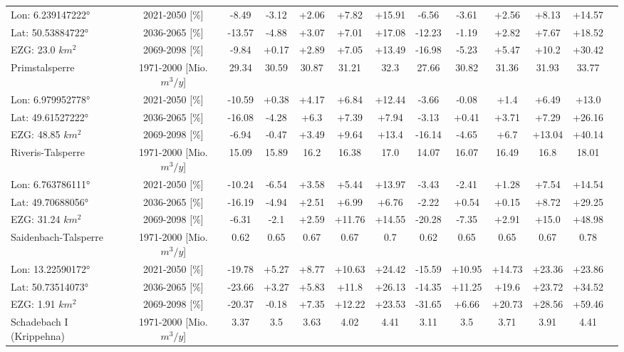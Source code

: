 \begin{longtable}{@{\extracolsep{\fill}}lc|ccccc||cccccc}
\cline{2-12} 
Lon: 6.239147222° & 2021-2050 [\%]  & -8.49 & -3.12 & +2.06 & +7.82 & +15.91 & -6.56 & -3.61 & +2.56 & +8.13 & +14.57\\ 
Lat: 50.53884722° & 2036-2065 [\%]  & -13.57 & -4.88 & +3.07 & +7.01 & +17.08 & -12.23 & -1.19 & +2.82 & +7.67 & +18.52\\ 
EZG: 23.0 $km^2$ & 2069-2098 [\%]  & -9.84 & +0.17 & +2.89 & +7.05 & +13.49 & -16.98 & -5.23 & +5.47 & +10.2 & +30.42\\ 
\hline 
Primstalsperre & 1971-2000 [Mio. $m^3/y$]  & 29.34 & 30.59 & 30.87 & 31.21 & 32.3 & 27.66 & 30.82 & 31.36 & 31.93 & 33.77\\ 
\cline{2-12} 
Lon: 6.979952778° & 2021-2050 [\%]  & -10.59 & +0.38 & +4.17 & +6.84 & +12.44 & -3.66 & -0.08 & +1.4 & +6.49 & +13.0\\ 
Lat: 49.61527222° & 2036-2065 [\%]  & -16.08 & -4.28 & +6.3 & +7.39 & +7.94 & -3.13 & +0.41 & +3.71 & +7.29 & +26.16\\ 
EZG: 48.85 $km^2$ & 2069-2098 [\%]  & -6.94 & -0.47 & +3.49 & +9.64 & +13.4 & -16.14 & -4.65 & +6.7 & +13.04 & +40.14\\ 
\hline 
Riveris-Talsperre & 1971-2000 [Mio. $m^3/y$]  & 15.09 & 15.89 & 16.2 & 16.38 & 17.0 & 14.07 & 16.07 & 16.49 & 16.8 & 18.01\\ 
\cline{2-12} 
Lon: 6.763786111° & 2021-2050 [\%]  & -10.24 & -6.54 & +3.58 & +5.44 & +13.97 & -3.43 & -2.41 & +1.28 & +7.54 & +14.54\\ 
Lat: 49.70688056° & 2036-2065 [\%]  & -16.19 & -4.94 & +2.51 & +6.99 & +6.76 & -2.22 & +0.54 & +0.15 & +8.72 & +29.25\\ 
EZG: 31.24 $km^2$ & 2069-2098 [\%]  & -6.31 & -2.1 & +2.59 & +11.76 & +14.55 & -20.28 & -7.35 & +2.91 & +15.0 & +48.98\\ 
\hline 
Saidenbach-Talsperre & 1971-2000 [Mio. $m^3/y$]  & 0.62 & 0.65 & 0.67 & 0.67 & 0.7 & 0.62 & 0.65 & 0.65 & 0.67 & 0.78\\ 
\cline{2-12} 
Lon: 13.22590172° & 2021-2050 [\%]  & -19.78 & +5.27 & +8.77 & +10.63 & +24.42 & -15.59 & +10.95 & +14.73 & +23.36 & +23.86\\ 
Lat: 50.73514073° & 2036-2065 [\%]  & -23.66 & +3.27 & +5.83 & +11.8 & +26.13 & -14.35 & +11.25 & +19.6 & +23.72 & +34.52\\ 
EZG: 1.91 $km^2$ & 2069-2098 [\%]  & -20.37 & -0.18 & +7.35 & +12.22 & +23.53 & -31.65 & +6.66 & +20.73 & +28.56 & +59.46\\ 
\hline 
Schadebach I (Krippehna) & 1971-2000 [Mio. $m^3/y$]  & 3.37 & 3.5 & 3.63 & 4.02 & 4.41 & 3.11 & 3.5 & 3.71 & 3.91 & 4.41\\ 

\end{longtable}
